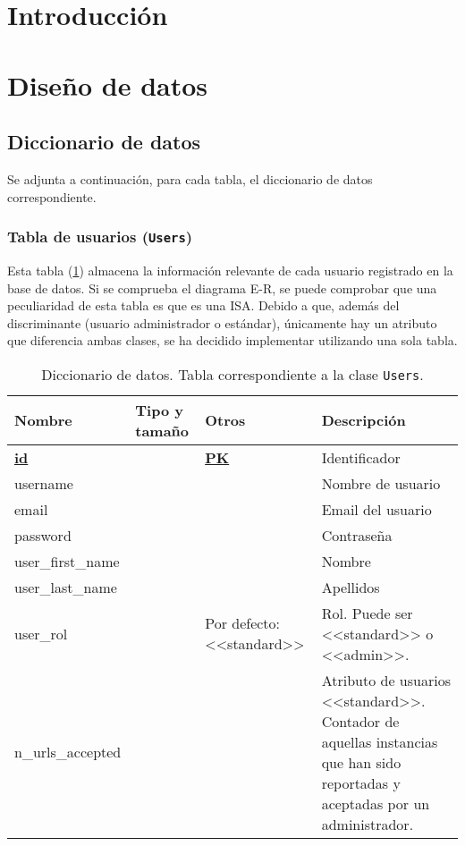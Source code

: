 
\section{Introducción}

\section{Diseño de datos}


\subsection{Diccionario de datos}

Se adjunta a continuación, para cada tabla, el diccionario de datos correspondiente.

\subsubsection{Tabla de usuarios (\texttt{Users})}
Esta tabla (\ref{datadic:users}) almacena la información relevante de cada usuario registrado en la base de datos. Si se comprueba el diagrama E-R, se puede comprobar que una peculiaridad de esta tabla es que es una ISA. Debido a que, además del discriminante (usuario administrador o estándar), únicamente hay un atributo que diferencia ambas clases, se ha decidido implementar utilizando una sola tabla.

\begin{table}
	\small
	\begin{centering}
		\begin{tabular}{@{}p{6em} p{6em} p{6em} p{12em}@{}}
			\toprule
			\textbf{Nombre} & \textbf{Tipo y tamaño} & \textbf{Otros} & \textbf{Descripción}\\
			\midrule
			\textbf{\underline{id}} & &  \textbf{\underline{PK}} & Identificador \\
			username &  &  &   Nombre de usuario\\
			email &  &  &  Email del usuario \\
			password &  &  &  Contraseña\\
			user\_first\_name &  &  &  Nombre \\
			user\_last\_name &  &  &  Apellidos \\
			user\_rol &  & Por defecto: <<standard>> & Rol. Puede ser <<standard>> o <<admin>>. \\
			n\_urls\_accepted &  &  &  Atributo de usuarios <<standard>>. Contador de aquellas instancias que han sido reportadas y aceptadas por un administrador. \\
			\bottomrule
		\end{tabular}
	\end{centering}
	\caption[Diccionario de datos: Users]{Diccionario de datos. Tabla correspondiente a la clase \texttt{Users}.}
	\label{datadic:users}
\end{table}

